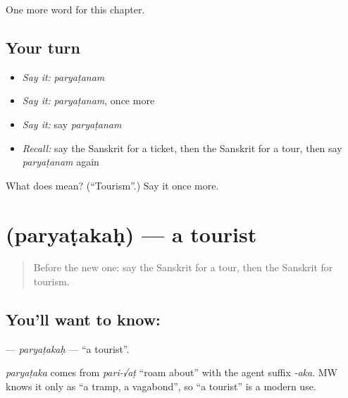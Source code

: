 \begin{grammarlens}[title={What you've built}]
One more word for this chapter.
\end{grammarlens}

\subsection*{Your turn}
\begin{itemize}
\raggedright
  \item \emph{Say it:} \emph{paryaṭanam}
  \item \emph{Say it:} \emph{paryaṭanam}, once more
  \item \emph{Say it:} say \emph{paryaṭanam}
  \item \emph{Recall:} say the Sanskrit for a ticket, then the Sanskrit for a tour, then say \emph{paryaṭanam} again
\end{itemize}

\begin{tcolorbox}[breakable,colback=teal!4,colframe=teal!35!black,title={Before you move on}]
What does  mean? (\textquotedblleft{}Tourism\textquotedblright{}.) Say it once more.
\end{tcolorbox}
\section[\texorpdfstring{\sk{पर्यटकः} (paryaṭakaḥ)}{पर्यटकः (paryaṭakaḥ)}]{ (paryaṭakaḥ) — a tourist}

\label{lesson:SA-C172-paryatakah}



\begin{quote}
Before the new one: say the Sanskrit for a tour, then the Sanskrit for tourism.
\end{quote}

\subsection*{You'll want to know: }
\textbf{} — \emph{paryaṭakaḥ} — \textquotedblleft{}a tourist\textquotedblright{}.

\begin{cousinweb}
\emph{paryaṭaka} comes from \emph{pari-√aṭ} \textquotedblleft{}roam about\textquotedblright{} with the agent suffix \emph{-aka}. MW knows it only as \textquotedblleft{}a tramp, a vagabond\textquotedblright{}, so \textquotedblleft{}a tourist\textquotedblright{} is a modern use.
\end{cousinweb}

